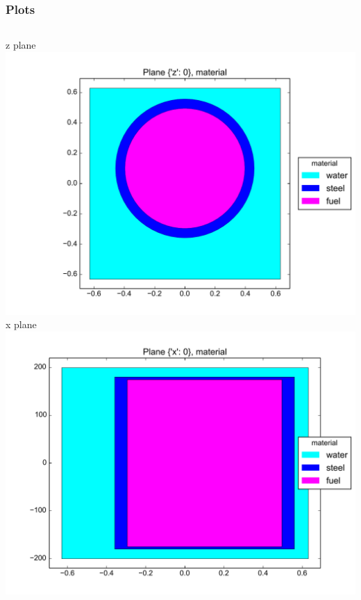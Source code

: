 \begin{frame}[fragile]
    \frametitle{Plots}
    \begin{columns}
            {\tiny z plane}
            \includegraphics[width=\textwidth]{examples/ex2z.pdf}
            {\tiny x plane}
            \includegraphics[width=\textwidth]{examples/ex2x.pdf}
    \end{columns}
\end{frame}

